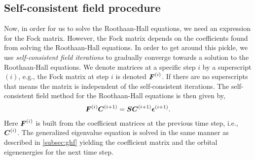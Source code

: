         \subsection{Self-consistent field procedure}
            Now, in order for us to solve the Roothaan-Hall equations, we need an
            expression for the Fock matrix.
            However, the Fock matrix depends on the coefficients found from
            solving the Roothaan-Hall equations.
            In order to get around this pickle, we use \emph{self-consistent
            field iterations} to gradually converge towards a solution to the
            Roothaan-Hall equations.
            We denote matrices at a specific step $i$ by a superscript $(i)$,
            e.g., the Fock matrix at step $i$ is denoted $\boldsymbol{F}^{(i)}$.
            If there are no superscripts that means the matrix is independent of
            the self-consistent iterations.
            The self-consistent field method for the Roothaan-Hall equations is
            then given by,
            \begin{align}
                \boldsymbol{F}^{(i)}\boldsymbol{C}^{(i + 1)}
                = \boldsymbol{S} \boldsymbol{C}^{(i + 1)}\boldsymbol{\epsilon}^{(i + 1)}.
                \label{eq:ghf-scf-roothan-hall}
            \end{align}
            Here $\boldsymbol{F}^{(i)}$ is built from the coefficient matrices at the
            previous time step, i.e., $\boldsymbol{C}^{(i)}$.
            The generalized eigenvalue equation is solved in the same manner as
            described in \autoref{subsec:ghf} yielding the coefficient matrix
            and the orbital eigenenergies for the next time step.

